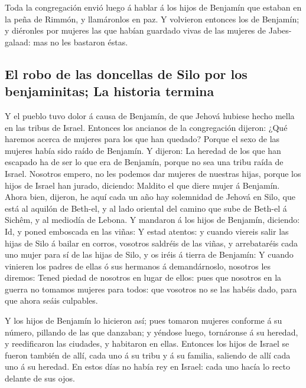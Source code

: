  Toda la congregación envió luego á hablar á los hijos de
Benjamín que estaban en la peña de Rimmón, y llamáronlos en paz.
 Y volvieron entonces los de Benjamín; y diéronles por
mujeres las que habían guardado vivas de las mujeres de Jabes-galaad:
mas no les bastaron éstas.

\hypertarget{el-robo-de-las-doncellas-de-silo-por-los-benjaminitas-la-historia-termina}{%
\subsection{El robo de las doncellas de Silo por los benjaminitas; La
historia
termina}\label{el-robo-de-las-doncellas-de-silo-por-los-benjaminitas-la-historia-termina}}

 Y el pueblo tuvo dolor á causa de Benjamín, de que
Jehová hubiese hecho mella en las tribus de Israel. 
Entonces los ancianos de la congregación dijeron: ¿Qué haremos acerca de
mujeres para los que han quedado? Porque el sexo de las mujeres había
sido raído de Benjamín.  Y dijeron: La heredad de los que
han escapado ha de ser lo que era de Benjamín, porque no sea una tribu
raída de Israel.  Nosotros empero, no les podemos dar
mujeres de nuestras hijas, porque los hijos de Israel han jurado,
diciendo: Maldito el que diere mujer á Benjamín.  Ahora
bien, dijeron, he aquí cada un año hay solemnidad de Jehová en Silo, que
está al aquilón de Beth-el, y al lado oriental del camino que sube de
Beth-el á Sichêm, y al mediodía de Lebona.  Y mandaron á
los hijos de Benjamín, diciendo: Id, y poned emboscada en las viñas:
 Y estad atentos: y cuando viereis salir las hijas de
Silo á bailar en corros, vosotros saldréis de las viñas, y arrebataréis
cada uno mujer para sí de las hijas de Silo, y os iréis á tierra de
Benjamín:  Y cuando vinieren los padres de ellas ó sus
hermanos á demandárnoslo, nosotros les diremos: Tened piedad de nosotros
en lugar de ellos: pues que nosotros en la guerra no tomamos mujeres
para todos: que vosotros no se las habéis dado, para que ahora seáis
culpables.

 Y los hijos de Benjamín lo hicieron así; pues tomaron
mujeres conforme á su número, pillando de las que danzaban; y yéndose
luego, tornáronse á su heredad, y reedificaron las ciudades, y habitaron
en ellas.  Entonces los hijos de Israel se fueron también
de allí, cada uno á su tribu y á su familia, saliendo de allí cada uno á
su heredad.  En estos días no había rey en Israel: cada
uno hacía lo recto delante de sus ojos.
